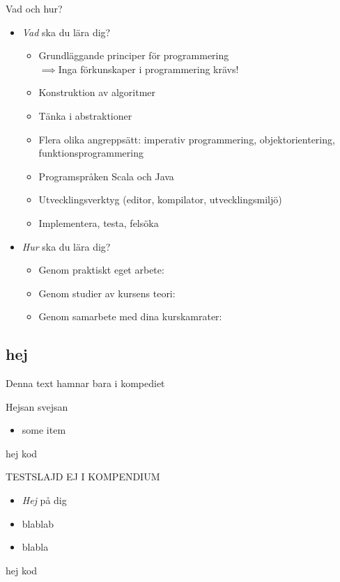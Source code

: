 

\begin{Slide}{Vad och hur?}
\begin{itemize}
\item \emph{Vad} ska du lära dig?
\begin{itemize}
\item Grundläggande principer för programmering\\ $\implies$Inga förkunskaper i programmering krävs!
\item Konstruktion av algoritmer
\item Tänka i abstraktioner
\item Flera olika angreppsätt: imperativ programmering, objektorientering, funktionsprogrammering
\item Programspråken Scala och Java
\item Utvecklingsverktyg (editor, kompilator, utvecklingsmiljö)
\item Implementera, testa, felsöka
\end{itemize}

\item \emph{Hur} ska du lära dig?
\begin{itemize}
\item Genom praktiskt eget arbete: 
\item Genom studier av kursens teori: 
\item Genom samarbete med dina kurskamrater: 
\end{itemize}
\end{itemize}
\end{Slide}


\ifkompendium
\subsection{hej}
Denna text hamnar bara i kompediet

Hejsan svejsan

\begin{itemize}
\item some item
\end{itemize}


\begin{Code}
hej kod
\end{Code}
\fi


\ifkompendium\else
\begin{Slide}{TESTSLAJD EJ I KOMPENDIUM}
\begin{itemize}
\item \emph{Hej} på dig
\item blablab
\item blabla
\end{itemize}
\begin{Code}
hej kod
\end{Code}
\end{Slide}
\fi


\ifkompendium\else
{} 
\fi